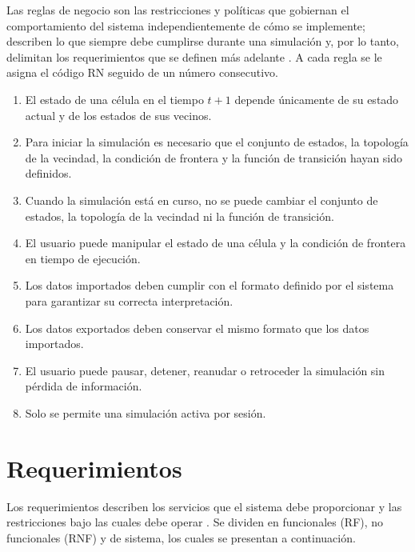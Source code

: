 Las reglas de negocio son las restricciones y políticas que gobiernan el comportamiento del sistema independientemente de cómo se implemente; describen lo que siempre debe cumplirse durante una simulación y, por lo tanto, delimitan los requerimientos que se definen más adelante \cite{ingenieria_1}. A cada regla se le asigna el código RN seguido de un número consecutivo.

\begin{enumerate}[label*=RN\arabic*, noitemsep, leftmargin=*]
	
	\item El estado de una célula en el tiempo $t + 1$ depende únicamente de su estado actual y de los estados de sus vecinos.
	
	\item Para iniciar la simulación es necesario que el conjunto de estados, la topología de la vecindad, la condición de frontera y la función de transición hayan sido definidos.
	
	\item Cuando la simulación está en curso, no se puede cambiar el conjunto de estados, la topología de la vecindad ni la función de transición.
	
	\item El usuario puede manipular el estado de una célula y la condición de frontera en tiempo de ejecución.
	
	\item Los datos importados deben cumplir con el formato definido por el sistema para garantizar su correcta interpretación.
	
	\item Los datos exportados deben conservar el mismo formato que los datos importados.
	
	\item El usuario puede pausar, detener, reanudar o retroceder la simulación sin pérdida de información. 
	
	\item Solo se permite una simulación activa por sesión.
	
\end{enumerate}

\section{Requerimientos}

Los requerimientos describen los servicios que el sistema debe proporcionar y las restricciones bajo las cuales debe operar \cite{ingenieria_1}. Se dividen en funcionales (RF), no funcionales (RNF) y de sistema, los cuales se presentan a continuación.

